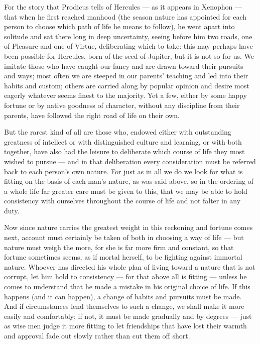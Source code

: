  For the story that Prodicus tells of Hercules — as it appears in Xenophon — that when he first reached manhood (the season nature has appointed for each person to choose which path of life he means to follow), he went apart into solitude and sat there long in deep uncertainty, seeing before him two roads, one of Pleasure and one of Virtue, deliberating which to take: this may perhaps have been possible for Hercules, born of the seed of Jupiter, but it is not so for us. We imitate those who have caught our fancy and are drawn toward their pursuits and ways; most often we are steeped in our parents' teaching and led into their habits and custom; others are carried along by popular opinion and desire most eagerly whatever seems finest to the majority. Yet a few, either by some happy fortune or by native goodness of character, without any discipline from their parents, have followed the right road of life on their own.

 But the rarest kind of all are those who, endowed either with outstanding greatness of intellect or with distinguished culture and learning, or with both together, have also had the leisure to deliberate which course of life they most wished to pursue — and in that deliberation every consideration must be referred back to each person's own nature. For just as in all we do we look for what is fitting on the basis of each man's nature, as was said above, so in the ordering of a whole life far greater care must be given to this, that we may be able to hold consistency with ourselves throughout the course of life and not falter in any duty.

 Now since nature carries the greatest weight in this reckoning and fortune comes next, account must certainly be taken of both in choosing a way of life — but nature must weigh the more, for she is far more firm and constant, so that fortune sometimes seems, as if mortal herself, to be fighting against immortal nature. Whoever has directed his whole plan of living toward a nature that is not corrupt, let him hold to consistency — for that above all is fitting — unless he comes to understand that he made a mistake in his original choice of life. If this happens (and it can happen), a change of habits and pursuits must be made. And if circumstances lend themselves to such a change, we shall make it more easily and comfortably; if not, it must be made gradually and by degrees — just as wise men judge it more fitting to let friendships that have lost their warmth and approval fade out slowly rather than cut them off short.

